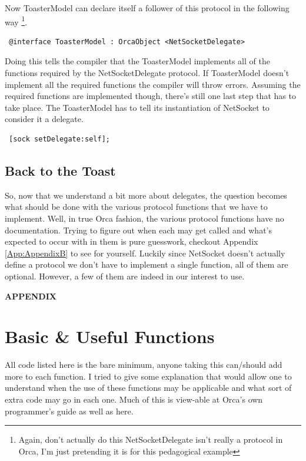\documentclass[12pt,a4paper]{article}
\begin{document}
 Now ToasterModel can declare itself a follower of this protocol in the following way
 \footnote{Again, don't actually do this NetSocketDelegate isn't really a protocol in Orca, I'm just pretending it is for this pedagogical example}.
  \begin{lstlisting}
 @interface ToasterModel : OrcaObject <NetSocketDelegate>
 \end{lstlisting}
Doing this tells the compiler that the ToasterModel implements all of the functions required by the NetSocketDelegate protocol.
If ToasterModel doesn't implement all the required functions the compiler will throw errors.
Assuming the required functions are implemented though, there's still one last step that has to take place.
The ToasterModel has to tell its instantiation of NetSocket to consider it a delegate. 
\begin{lstlisting}
 [sock setDelegate:self];  
\end{lstlisting}

\subsection{Back to the Toast}
So, now that we understand a bit more about delegates, the question becomes what should be done with the various protocol functions that we have to implement.
Well, in true Orca fashion, the various protocol functions have no documentation. 
Trying to figure out when each may get called and what's expected to occur with in them is pure guesswork, checkout Appendix \ref{App:AppendixB} to see for yourself. 
Luckily since NetSocket doesn't actually define a protocol we don't have to implement a single function, all of them are optional. 
However, a few of them are indeed in our interest to use.





  



\newpage
    \begin{center}
      {\bf APPENDIX}
    \end{center}
    
\appendix
\section{Basic \& Useful Functions} \label{App:AppendixA}
All code listed here is the bare minimum, anyone taking this can/should add more to each function. 
I tried to give some explanation that would allow one to understand when the use of these functions may be applicable and what sort of extra code may go in each one. 
Much of this is view-able at Orca's own programmer's guide as well as here.
\\
\end{document}
